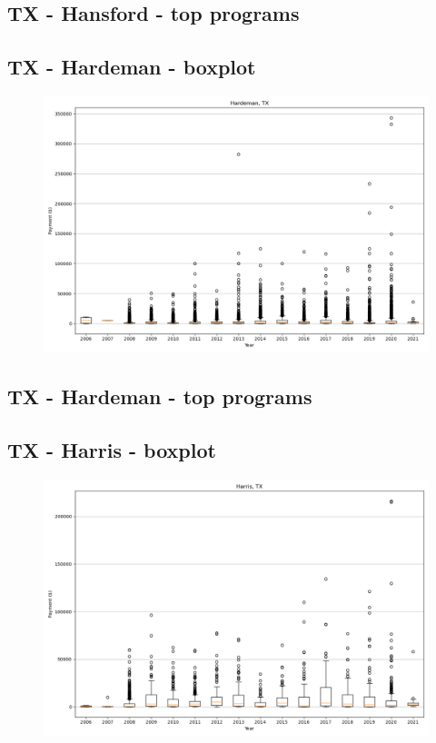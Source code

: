 \subsection*{TX - Hansford - top programs}

\newpage
\subsection*{TX - Hardeman - boxplot}
\begin{figure}[h]
\centering
\includegraphics[width=7in]{../output/boxplots/counties/Hardeman-TX_boxplot.png}
\end{figure}


\subsection*{TX - Hardeman - top programs}

\newpage
\subsection*{TX - Harris - boxplot}
\begin{figure}[h]
\centering
\includegraphics[width=7in]{../output/boxplots/counties/Harris-TX_boxplot.png}
\end{figure}


